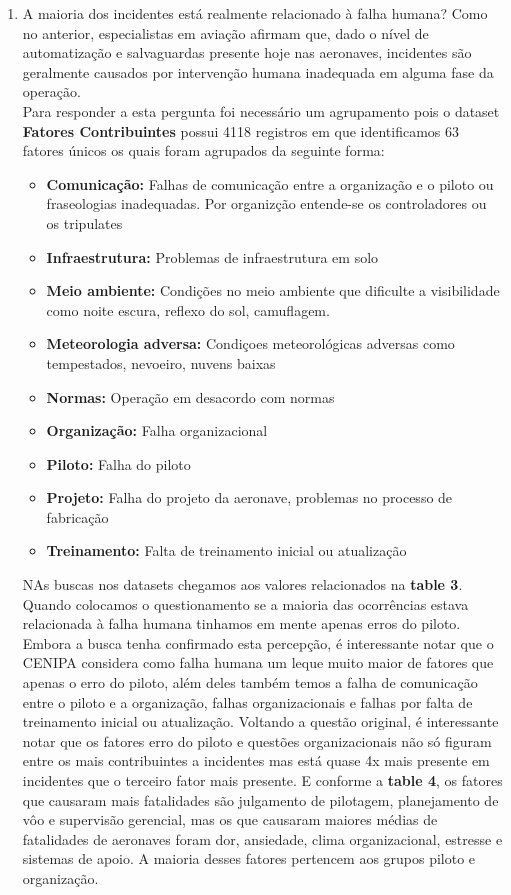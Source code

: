 \documentclass[conference]{IEEEtran}
\begin{document}
\begin{enumerate}
 \item A maioria dos incidentes está realmente relacionado à falha humana? Como no anterior, especialistas em aviação afirmam que, dado o nível de automatização e salvaguardas 
 presente hoje nas aeronaves, incidentes são geralmente causados por intervenção humana inadequada em alguma fase da operação.\\
 
 Para responder a esta pergunta foi necessário um agrupamento pois o dataset \textbf{Fatores Contribuintes} possui 4118 registros em que identificamos 63 fatores únicos os quais
 foram agrupados da seguinte forma:
 
 \begin{itemize}
  \item \textbf{Comunicação:} Falhas de comunicação entre a organização e o piloto ou fraseologias inadequadas. Por organizção entende-se os controladores ou os tripulates
  \item \textbf{Infraestrutura:} Problemas de infraestrutura em solo
  \item \textbf{Meio ambiente:} Condições no meio ambiente que dificulte a visibilidade como noite escura, reflexo do sol, camuflagem.
  \item \textbf{Meteorologia adversa:} Condiçoes meteorológicas adversas como tempestados, nevoeiro, nuvens baixas
  \item \textbf{Normas:} Operação em desacordo com normas
  \item \textbf{Organização:} Falha organizacional
  \item \textbf{Piloto:} Falha do piloto
  \item \textbf{Projeto:} Falha do projeto da aeronave, problemas no processo de fabricação
  \item \textbf{Treinamento:} Falta de treinamento inicial ou atualização
 \end{itemize}
 
 NAs buscas nos datasets chegamos aos valores relacionados na \textbf{table 3}. Quando colocamos o questionamento se a maioria das ocorrências estava relacionada à falha
 humana tinhamos em mente apenas erros do piloto. Embora a busca tenha confirmado esta percepção, é interessante notar que o CENIPA considera como falha humana um leque 
 muito maior de fatores que apenas o erro do piloto, além deles também temos a falha de comunicação entre o piloto e a organização, falhas organizacionais e falhas por 
 falta de treinamento inicial ou atualização. Voltando a questão original, é interessante notar que os fatores erro do piloto e questões organizacionais não só figuram 
 entre os mais contribuintes a incidentes mas está quase 4x mais presente em incidentes que o terceiro fator mais presente. E conforme a \textbf{table 4}, os fatores que causaram 
 mais fatalidades são julgamento de pilotagem, planejamento de vôo e supervisão gerencial, mas os que causaram maiores médias de fatalidades de aeronaves foram dor, 
 ansiedade, clima organizacional, estresse e sistemas de apoio. A maioria desses fatores pertencem aos grupos piloto e organização.\\
 
\end{enumerate}
\end{document}
